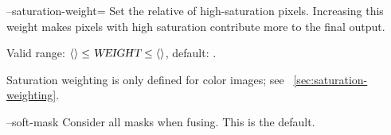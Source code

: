 \begin{codelist}
  \label{opt:saturation-weight}%
\item[--saturation-weight=\metavar{WEIGHT}]\itemend
  Set the relative  of high-saturation pixels.  Increasing this weight makes
  pixels with high saturation contribute more to the final output.

  Valid range: $\val{val:minimum-weight-saturation} \leq \metavar{WEIGHT} \leq
  \val{val:maximum-weight-saturation}$, default: .

  Saturation weighting is only defined for color images; see
  \sectionName~\ref{sec:saturation-weighting}.


  \label{opt:soft-mask}%
\item[--soft-mask]\itemend
  Consider all masks when fusing.  This is the default.
\end{codelist}



